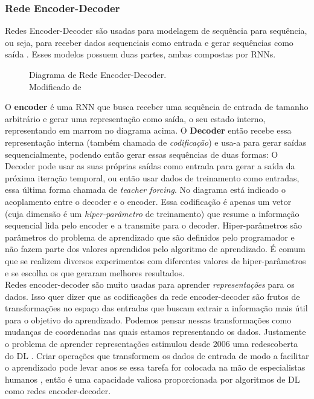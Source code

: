 \subsubsection{Rede Encoder-Decoder}
\label{sec:encdec}
Redes Encoder-Decoder são usadas para modelagem de sequência para
sequência, ou seja, para receber dados sequenciais como entrada e gerar
sequências como saída \citep{dlbook}. Esses modelos possuem duas partes, ambas compostas por
RNNs. \\

\begin{figure}[H]
\centering

\caption{ Diagrama de Rede Encoder-Decoder.\\ Modificado de \cite{encdec}}

\end{figure}
  
O \textbf{encoder} é uma RNN que busca receber uma sequência de entrada de
tamanho arbitrário e gerar uma representação como saída, o seu estado interno,
representando em marrom no diagrama acima. O \textbf{Decoder} então recebe essa representação interna (também chamada
de \textit{codificação}) e usa-a para gerar saídas sequencialmente, podendo
então gerar essas sequências de duas formas: O Decoder pode usar as suas próprias saídas
como entrada para gerar a saída da próxima iteração temporal, ou então usar dados de treinamento como
entradas, essa última forma chamada de \textit{teacher forcing}. No diagrama
está indicado o acoplamento entre o decoder e o encoder. Essa codificação é apenas
um vetor (cuja dimensão é um \textit{hiper-parâmetro} de treinamento) que resume a
informação sequencial lida pelo encoder e a transmite para o decoder.
Hiper-parâmetros são parâmetros do problema de aprendizado que são definidos
pelo programador e não fazem parte dos valores aprendidos pelo algoritmo de
aprendizado. É comum que se realizem diversos experimentos com diferentes
valores de hiper-parâmetros e se escolha os que geraram melhores resultados. 
\\

Redes encoder-decoder são muito usadas para aprender \textit{representações} para os
dados. Isso quer dizer que as codificações da rede encoder-decoder são frutos de
transformações no espaço das entradas que buscam extrair a informação mais útil
para o objetivo do aprendizado. Podemos pensar nessas transformações como
mudanças de coordenadas nas quais estamos representando os dados. Justamente o problema de aprender
representações estimulou desde 2006 uma redescoberta do DL \citep{dlbook}. Criar
operações que transformem os dados de entrada de modo a facilitar o aprendizado
pode levar anos se essa tarefa for colocada na mão de especialistas humanos
\citep{dlbook}, então é uma capacidade valiosa proporcionada por algoritmos de
DL como redes encoder-decoder. \\



